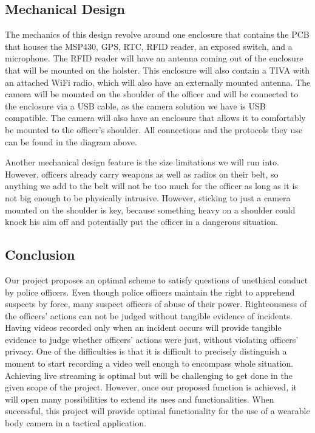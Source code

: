 \documentclass[12pt]{article}
\begin{document}
\subsection{Mechanical Design}
The mechanics of this design revolve around one enclosure that contains the PCB
that houses the MSP430, GPS, RTC, RFID reader, an exposed switch, and a
microphone. The RFID reader will have an antenna coming out of the enclosure
that will be mounted on the holster. This enclosure will also contain a TIVA
with an attached WiFi radio, which will also have an externally mounted
antenna. The camera will be mounted on the shoulder of the officer and will be
connected to the enclosure via a USB cable, as the camera solution we have is
USB compatible. The camera will also have an enclosure that allows it to
comfortably be mounted to the officer's shoulder. All connections and the
protocols they use can be found in the diagram above.

Another mechanical design feature is the size limitations we will run into.
However, officers already carry weapons as well as radios on their belt, so
anything we add to the belt will not be too much for the officer as long as it
is not big enough to be physically intrusive. However, sticking to just a
camera mounted on the shoulder is key, because something heavy on a shoulder
could knock his aim off and potentially put the officer in a dangerous
situation. 

\subsection{Conclusion}
Our project proposes an optimal scheme to satisfy questions of unethical
conduct by police officers. Even though police officers maintain the right to
apprehend suspects by force, many suspect officers of abuse of their power.
Righteousness of the officers’ actions can not be judged without tangible
evidence of incidents. Having videos recorded only when an incident occurs will
provide tangible evidence to judge whether officers’ actions were just, without
violating officers’ privacy. One of the difficulties is that it is difficult to
precisely distinguish a moment to start recording a video well enough to
encompass whole situation. Achieving live streaming is optimal but will be
challenging to get done in the given scope of the project. However, once our
proposed function is achieved, it will open many possibilities to extend its
uses and functionalities. When successful, this project will provide optimal
functionality for the use of a wearable body camera in a tactical application. 
\end{document}
